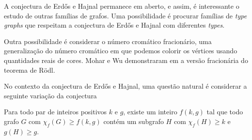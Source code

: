 
A conjectura de Erd\H{o}s e Hajnal permanece em aberto, e assim, é interessante o estudo de outras famílias de grafos. Uma possibilidade é procurar famílias de \textit{type graphs} que respeitam a conjectura de Erd\H{o}s e Hajnal com diferentes \textit{types}.

Outra possibilidade é considerar o número cromático fracionário, uma generalização do número cromático em que podemos colorir os vértices usando quantidades reais de cores. Mohar e Wu demonstraram em \cite{mohar2015triangle} a versão fracionária do teorema de R\"{o}dl.

No contexto da conjectura de Erd\H{o}s e Hajnal, uma questão natural é considerar a seguinte variação da conjectura

\begin{conjectura}
Para todo par de inteiros positivos $k$ e $g$, existe um inteiro $f(k,g)$ tal que todo grafo $G$ com $\chi_f(G) \geq f(k,g)$ contém um subgrafo $H$ com $\chi_f(H)\geq k$ e $g(H) \geq g$.
\end{conjectura}